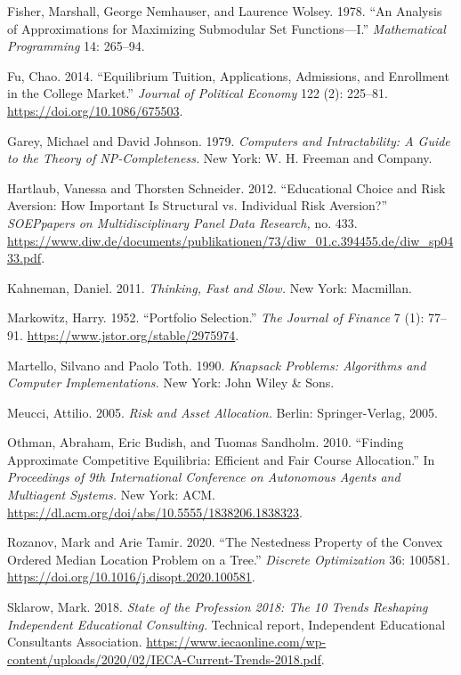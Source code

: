 \documentclass[11pt]{article} %
\theoremstyle{definition}
\theoremstyle{definition}
\begin{document}
Fisher, Marshall, George Nemhauser, and Laurence Wolsey. 1978. ``An Analysis of Approximations for Maximizing Submodular Set Functions—I.'' \emph{Mathematical Programming} 14: 265--94. 


Fu, Chao. 2014. ``Equilibrium Tuition, Applications, Admissions, and Enrollment in the College Market.'' \emph{Journal of Political Economy} 122 (2): 225--81. \url{https://doi.org/10.1086/675503}. 

Garey, Michael and David Johnson. 1979. \emph{Computers and Intractability: A Guide to the Theory of NP-Completeness.} New York: W. H. Freeman and Company. 

Hartlaub, Vanessa and Thorsten Schneider. 2012. “Educational Choice and Risk Aversion: How Important Is Structural vs. Individual Risk Aversion?” \emph{SOEPpapers on Multidisciplinary Panel Data Research,} no. 433. \url{https://www.diw.de/documents/publikationen/73/diw_01.c.394455.de/diw_sp0433.pdf}.

Kahneman, Daniel. 2011. \emph{Thinking, Fast and Slow.} New York: Macmillan.

Markowitz, Harry. 1952. ``Portfolio Selection.'' \emph{The Journal of Finance} 7 (1): 77--91. \url{https://www.jstor.org/stable/2975974}.

Martello, Silvano and Paolo Toth. 1990. \emph{Knapsack Problems: Algorithms and Computer Implementations.} New York: John Wiley \& Sons. 

Meucci, Attilio. 2005. \emph{Risk and Asset Allocation.} Berlin: Springer-Verlag, 2005. 

Othman, Abraham, Eric Budish, and Tuomas Sandholm. 2010. ``Finding Approximate Competitive Equilibria: Efficient and Fair
Course Allocation.'' In \emph{Proceedings of 9th International Conference on Autonomous Agents and Multiagent Systems.} New York: ACM. \url{https://dl.acm.org/doi/abs/10.5555/1838206.1838323}.

Rozanov, Mark and Arie Tamir. 2020. ``The Nestedness Property of the Convex Ordered Median Location Problem on a Tree.'' \emph{Discrete Optimization} 36: 100581. \url{https://doi.org/10.1016/j.disopt.2020.100581}.

Sklarow, Mark. 2018. \emph{State of the Profession 2018: The 10 Trends Reshaping Independent Educational Consulting.} Technical report, Independent Educational Consultants Association. \url{https://www.iecaonline.com/wp-content/uploads/2020/02/IECA-Current-Trends-2018.pdf}.
\end{document}
